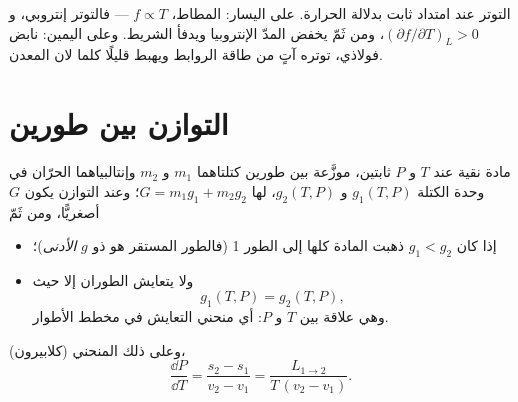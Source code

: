 \begin{omfigure}

{\small التوتر عند امتداد ثابت بدلالة الحرارة. على اليسار: المطاط،
$f \propto T$ --- فالتوتر إنتروبي، و $(\partial f/\partial T)_L > 0$،
ومن ثَمّ يخفض المدّ الإنتروبيا ويدفأ الشريط. وعلى اليمين: نابض
فولاذي، توتره آتٍ من طاقة الروابط ويهبط قليلًا
كلما لان المعدن.}
\end{omfigure}

\section{التوازن بين طورين}

\begin{theorem}\label{thm:b2:thermodynamic-potentials:coexistence}
مادة نقية عند $T$ و $P$ ثابتين، موزَّعة بين طورين كتلتاهما
$m_1$ و $m_2$ وإنتالبياهما الحرّان في وحدة الكتلة $g_1(T,P)$ و
$g_2(T,P)$، لها $G = m_1g_1 + m_2g_2$؛ وعند التوازن يكون $G$ أصغريًّا، ومن ثَمّ
\begin{itemize}
\item إذا كان $g_1 < g_2$ ذهبت المادة كلها إلى الطور 1 (فالطور
      المستقر هو ذو $g$ \emph{الأدنى})؛
\item ولا يتعايش الطوران إلا حيث
      \[
      g_1(T,P) = g_2(T,P) ,
      \]
      وهي علاقة بين $T$ و $P$: أي منحني التعايش في مخطط
      الأطوار.
\end{itemize}
وعلى ذلك المنحني (كلابيرون)،
\[
\frac{\dd P}{\dd T} = \frac{s_2 - s_1}{v_2 - v_1} = \frac{L_{1\to2}}{T\,(v_2 - v_1)} .
\]
\end{theorem}

